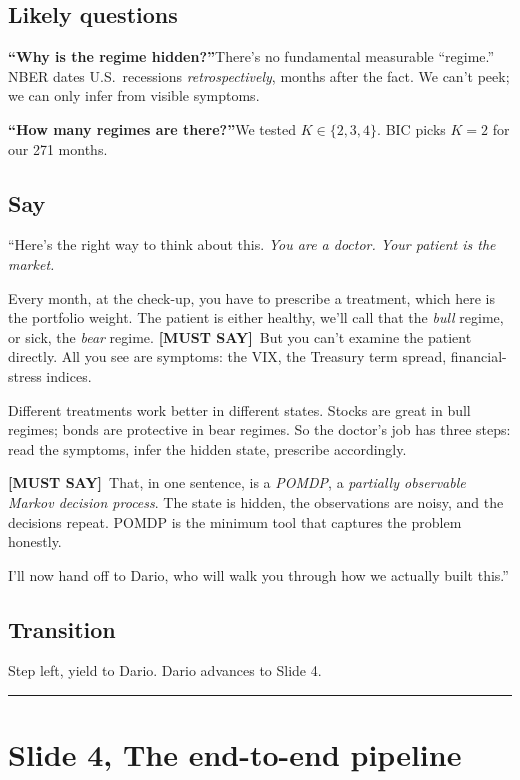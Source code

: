 \documentclass[11pt]{article}
\newcommand{\mustsay}[1]{\textcolor{must}{\textbf{[MUST SAY]}}\ #1}
\begin{document}
\subsection*{Likely questions}

\textbf{``Why is the regime hidden?''}\quad There's no fundamental measurable ``regime.'' NBER dates U.S.\ recessions \emph{retrospectively}, months after the fact. We can't peek; we can only infer from visible symptoms.

\textbf{``How many regimes are there?''}\quad We tested $K \in \{2, 3, 4\}$. BIC picks $K = 2$ for our 271 months.

\subsection*{Say}

``Here's the right way to think about this. \emph{You are a doctor. Your patient is the market.}

Every month, at the check-up, you have to prescribe a treatment, which here is the portfolio weight. The patient is either healthy, we'll call that the \emph{bull} regime, or sick, the \emph{bear} regime. \mustsay{But you can't examine the patient directly. All you see are symptoms: the VIX, the Treasury term spread, financial-stress indices.}

Different treatments work better in different states. Stocks are great in bull regimes; bonds are protective in bear regimes. So the doctor's job has three steps: read the symptoms, infer the hidden state, prescribe accordingly.

\mustsay{That, in one sentence, is a \emph{POMDP}, a \emph{partially observable Markov decision process}. The state is hidden, the observations are noisy, and the decisions repeat. POMDP is the minimum tool that captures the problem honestly.}

I'll now hand off to Dario, who will walk you through how we actually built this.''

\subsection*{Transition}

Step left, yield to Dario. Dario advances to Slide 4.

\bigskip\hrule

\section*{Slide 4, The end-to-end pipeline}
\end{document}
